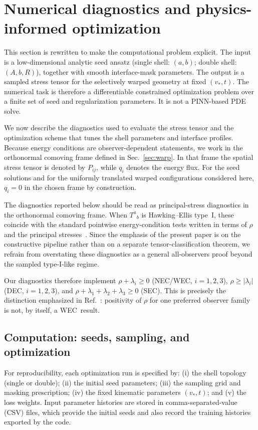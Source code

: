 \documentclass[11pt]{article}
\makeatletter
\newcommand{\@abbr}[1]{\ifmmode\mathrm{#1}\else\textsc{#1}\fi}
\newcommand{\WEC}{\@abbr{WEC}}
\newcommand{\NEC}{\@abbr{NEC}}
\newcommand{\SEC}{\@abbr{SEC}}
\newcommand{\DEC}{\@abbr{DEC}}
\makeatother
\begin{document}
\section{Numerical diagnostics and physics-informed optimization}
\label{sec:numerics}

This section is rewritten to make the computational problem explicit. The input is a low-dimensional analytic seed ansatz (single shell: $(a,b)$; double shell: $(A,b,R)$), together with smooth interface-mask parameters. The output is a sampled stress tensor for the selectively warped geometry at fixed $(v_*,t)$. The numerical task is therefore a differentiable constrained optimization problem over a finite set of seed and regularization parameters. It is not a PINN-based PDE solve.

We now describe the diagnostics used to evaluate the stress tensor and the optimization scheme that tunes the shell parameters and interface profiles.  Because energy conditions are observer-dependent statements, we work in the orthonormal comoving frame defined in Sec.~\ref{sec:warp}. In that frame the spatial stress tensor is denoted by $P_{ij}$, while $q_i$ denotes the energy flux. For the seed solutions and for the uniformly translated warped configurations considered here, $q_i=0$ in the chosen frame by construction.

The diagnostics reported below should be read as principal-stress diagnostics in the orthonormal comoving frame. When $T^{a}{}_{b}$ is Hawking--Ellis type~I, these coincide with the standard pointwise energy-condition tests written in terms of $\rho$ and the principal stresses~\cite{HawkingEllis1973,Maeda:2022vld}. Since the emphasis of the present paper is on the constructive pipeline rather than on a separate tensor-classification theorem, we refrain from overstating these diagnostics as a general all-observers proof beyond the sampled type-I-like regime.

Our diagnostics therefore implement $\rho+\lambda_i\ge 0$ (\NEC/\WEC, $i=1,2,3$), $\rho\ge |\lambda_i|$ (\DEC, $i=1,2,3$), and $\rho+\lambda_1+\lambda_2+\lambda_3\ge 0$ (\SEC). 
This is precisely the distinction emphasized in Ref.~\cite{Santiago:2021aup}: positivity of $\rho$ for one preferred observer family is not, by itself, a \WEC\ result.

\subsection{Computation: seeds, sampling, and optimization}
\label{sec:comp}
For reproducibility, each optimization run is specified by: (i) the shell topology (single or double); (ii) the initial seed parameters; (iii) the sampling grid and masking prescription; (iv) the fixed kinematic parameters $(v_*,t)$; and (v) the loss weights. Input parameter histories are stored in comma-separated-value (CSV) files, which provide the initial seeds and also record the training histories exported by the code.
\end{document}
